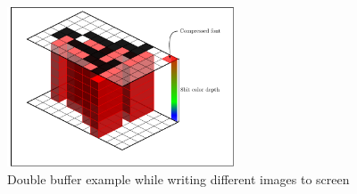 \begin{figure}[H]
	\centering
	\includegraphics[width=0.6\textwidth]{2-theory/drawing-graphics/graphics/drawingfont8red.pdf}
	\caption{Double buffer example while writing different images to screen\label{theory:fontgreen}}
\end{figure}



